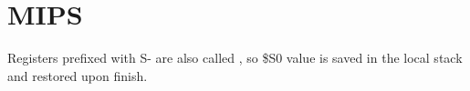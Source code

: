 \section{MIPS}



Registers prefixed with S- are also called , 
so \$S0 value is saved in the local stack
and restored upon finish.
